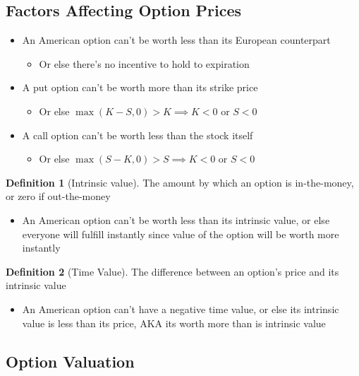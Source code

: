 \documentclass[11pt]{article}
\theoremstyle{definition}
\newtheorem*{definition}{Definition}
\begin{document}
\subsection{Factors Affecting Option Prices}
\begin{itemize}
    \item An American option can't be worth less than its European counterpart
    \begin{itemize}
        \item Or else there's no incentive to hold to expiration
    \end{itemize}
    \item A put option can't be worth more than its strike price
    \begin{itemize}
        \item Or else $\max(K-S, 0) > K \implies K < 0$ or $S < 0$
    \end{itemize}
    \item A call option can't be worth less than the stock itself
    \begin{itemize}
        \item Or else $\max(S-K, 0) > S \implies K < 0$ or $S < 0$
    \end{itemize}
\end{itemize}
\begin{definition}[Intrinsic value]
    The amount by which an option is in-the-money, or zero if out-the-money
\end{definition}
\begin{itemize}
    \item An American option can't be worth less than its intrinsic value, or else everyone will fulfill instantly since value of the option will be worth more instantly 
\end{itemize}
\begin{definition}[Time Value]
    The difference between an option's price and its intrinsic value
\end{definition}
\begin{itemize}
    \item An American option can't have a negative time value, or else its intrinsic value is less than its price, AKA its worth more than is intrinsic value
\end{itemize}


\subsection{Option Valuation}
\end{document}
